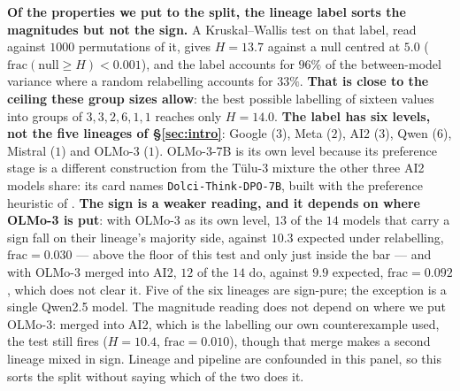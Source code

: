 \textbf{Of the properties we put to the split, the lineage label sorts the magnitudes but not the sign.} A Kruskal--Wallis test on that label, read against $1000$ permutations of it, gives $H=13.7$ against a null centred at $5.0$ ($\mathrm{frac}(\mathrm{null}\ge H)<0.001$), and the label accounts for $96\%$ of the between-model variance where a random relabelling accounts for $33\%$. \textbf{That is close to the ceiling these group sizes allow}: the best possible labelling of sixteen values into groups of $3,3,2,6,1,1$ reaches only $H=14.0$. \textbf{The label has six levels, not the five lineages of \S\ref{sec:intro}}: Google ($3$), Meta ($2$), AI2 ($3$), Qwen ($6$), Mistral ($1$) and OLMo-3 ($1$). OLMo-3-7B is its own level because its preference stage is a different construction from the T\"ulu-3 mixture the other three AI2 models share: its card names \texttt{Dolci-Think-DPO-7B}, built with the preference heuristic of \citet{geng2025delta}. \textbf{The sign is a weaker reading, and it depends on where OLMo-3 is put}: with OLMo-3 as its own level, $13$ of the $14$ models that carry a sign fall on their lineage's majority side, against $10.3$ expected under relabelling, $\mathrm{frac}=0.030$ --- above the floor of this test and only just inside the bar --- and with OLMo-3 merged into AI2, $12$ of the $14$ do, against $9.9$ expected, $\mathrm{frac}=0.092$, which does not clear it. Five of the six lineages are sign-pure; the exception is a single Qwen2.5 model. The magnitude reading does not depend on where we put OLMo-3: merged into AI2, which is the labelling our own counterexample used, the test still fires ($H=10.4$, $\mathrm{frac}=0.010$), though that merge makes a second lineage mixed in sign. Lineage and pipeline are confounded in this panel, so this sorts the split without saying which of the two does it.
